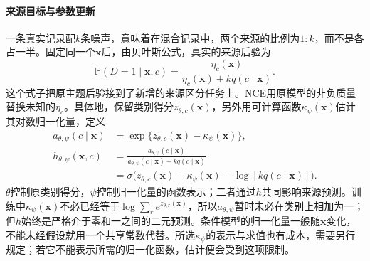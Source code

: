 \paragraph{来源目标与参数更新}
一条真实记录配$k$条噪声，意味着在混合记录中，两个来源的比例为$1:k$，而不是各占一半。固定同一个$\bm x$后，由贝叶斯公式，真实的来源后验为
\[
  \mathbb P(D=1\mid\bm x,c)
  =\frac{\eta_c(\bm x)}
    {\eta_c(\bm x)+kq(c\mid\bm x)}.
\]
这个式子把原主题后验接到了新增的来源区分任务上。NCE用原模型的非负质量替换未知的$\eta_c$。具体地，保留类别得分$z_{\theta,c}(\bm x)$，另外用可计算函数$\kappa_{\psi}(\bm x)$估计其对数归一化量，定义
\begin{equation}
  \label{eq:classification-nce-source-model}
  \begin{aligned}
    a_{\theta,\psi}(c\mid\bm x)
      &=\exp\{z_{\theta,c}(\bm x)-\kappa_{\psi}(\bm x)\},\\
    h_{\theta,\psi}(\bm x,c)
      &=\frac{a_{\theta,\psi}(c\mid\bm x)}
        {a_{\theta,\psi}(c\mid\bm x)+kq(c\mid\bm x)}\\
      &=\sigma\bigl(z_{\theta,c}(\bm x)-\kappa_{\psi}(\bm x)
                  -\log[kq(c\mid\bm x)]\bigr).
  \end{aligned}
\end{equation}
$\theta$控制原类别得分，$\psi$控制归一化量的函数表示；二者通过$h$共同影响来源预测。训练中$\kappa_{\psi}(\bm x)$不必已经等于$\log\sum_r e^{z_{\theta,r}(\bm x)}$，所以$a_{\theta,\psi}$暂时未必在类别上相加为一；但$h$始终是严格介于零和一之间的二元预测。条件模型的归一化量一般随$\bm x$变化，不能未经假设就用一个共享常数代替。所选$\kappa_{\psi}$的表示与求值也有成本，需要另行规定；若它不能表示所需的归一化函数，估计便会受到这项限制。

